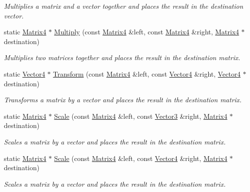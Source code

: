 \begin{DoxyCompactItemize}
\begin{DoxyCompactList}\small\item\em Multiplies a matrix and a vector together and places the result in the destination vector. \end{DoxyCompactList}\item 
static \hyperlink{class_flounder_1_1_matrix4}{Matrix4} $\ast$ \hyperlink{class_flounder_1_1_matrix4_a285cd690c358ad4865b0fb53f37accd9}{Multiply} (const \hyperlink{class_flounder_1_1_matrix4}{Matrix4} \&left, const \hyperlink{class_flounder_1_1_matrix4}{Matrix4} \&right, \hyperlink{class_flounder_1_1_matrix4}{Matrix4} $\ast$destination)
\begin{DoxyCompactList}\small\item\em Multiplies two matrices together and places the result in the destination matrix. \end{DoxyCompactList}\item 
static \hyperlink{class_flounder_1_1_vector4}{Vector4} $\ast$ \hyperlink{class_flounder_1_1_matrix4_a060b0289482a98fae63082ba03dccc80}{Transform} (const \hyperlink{class_flounder_1_1_matrix4}{Matrix4} \&left, const \hyperlink{class_flounder_1_1_vector4}{Vector4} \&right, \hyperlink{class_flounder_1_1_vector4}{Vector4} $\ast$destination)
\begin{DoxyCompactList}\small\item\em Transforms a matrix by a vector and places the result in the destination matrix. \end{DoxyCompactList}\item 
static \hyperlink{class_flounder_1_1_matrix4}{Matrix4} $\ast$ \hyperlink{class_flounder_1_1_matrix4_a5ff0b8f30451e769f3c5f27741cb71ab}{Scale} (const \hyperlink{class_flounder_1_1_matrix4}{Matrix4} \&left, const \hyperlink{class_flounder_1_1_vector3}{Vector3} \&right, \hyperlink{class_flounder_1_1_matrix4}{Matrix4} $\ast$destination)
\begin{DoxyCompactList}\small\item\em Scales a matrix by a vector and places the result in the destination matrix. \end{DoxyCompactList}\item 
static \hyperlink{class_flounder_1_1_matrix4}{Matrix4} $\ast$ \hyperlink{class_flounder_1_1_matrix4_a590ea434cf195abfc714487a4cc6ab81}{Scale} (const \hyperlink{class_flounder_1_1_matrix4}{Matrix4} \&left, const \hyperlink{class_flounder_1_1_vector4}{Vector4} \&right, \hyperlink{class_flounder_1_1_matrix4}{Matrix4} $\ast$destination)
\begin{DoxyCompactList}\small\item\em Scales a matrix by a vector and places the result in the destination matrix. \end{DoxyCompactList}\item 

\end{DoxyCompactItemize}
